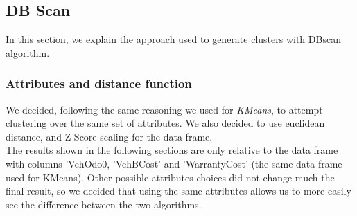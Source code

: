 \documentclass{article}
\begin{document}
\subsection{DB Scan}
In this section, we explain the approach used to generate clusters with DBscan algorithm.

\subsubsection{Attributes and distance function}
We decided, following the same reasoning we used for \emph{KMeans}, to attempt clustering over the same set of attributes. We also decided to use euclidean distance, and Z-Score scaling for the data frame.\\
The results shown in the following sections are only relative to the data frame with columns 'VehOdo0, 'VehBCost' and 'WarrantyCost' (the same data frame used for KMeans). Other possible attributes choices did not change much the final result, so we decided that using the same attributes allows us to more easily see the difference between the two algorithms.
\end{document}
